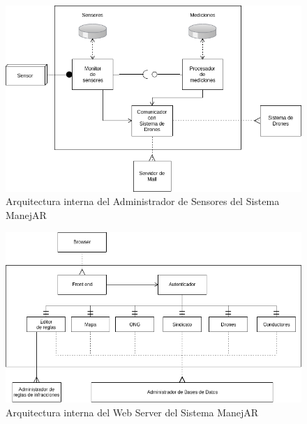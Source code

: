 \begin{figure}
\centerline{\includegraphics[width=1\textwidth]{./imagenes/arquitectura_tp2/administrador_sensores.png}}
\caption{Arquitectura interna del Administrador de Sensores del Sistema ManejAR}
\end{figure}


\begin{figure}
\centerline{\includegraphics[width=1\textwidth]{./imagenes/arquitectura_tp2/web_server.png}}
\caption{Arquitectura interna del Web Server del Sistema ManejAR}
\end{figure}
